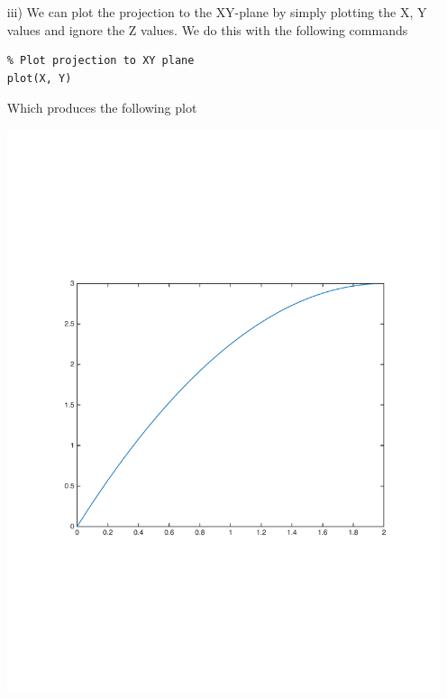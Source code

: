 \documentclass[11pt]{article}
\begin{document}
\begin{itemize}
\begin{itemize}
        \item[iii)]
            We can plot the projection to the XY-plane by simply plotting the X, Y values and ignore the Z values. We do this with the following commands
            \begin{lstlisting}
% Plot projection to XY plane
plot(X, Y)
            \end{lstlisting}
            
            Which produces the following plot
            \begin{center}
            \includegraphics[width=\linewidth]{1biii}
            \end{center}
        
        \end{itemize}
        

    

\end{itemize}
\end{document}
